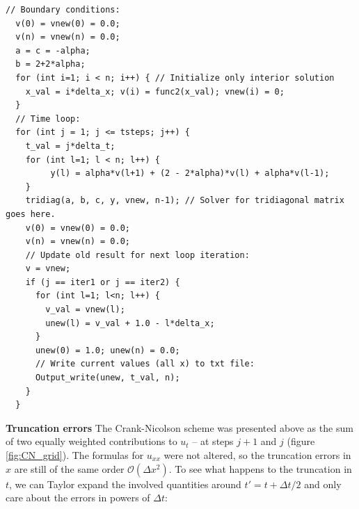 \documentclass[a4paper, 11pt, notitlepage,english]{article}
\begin{document}
\begin{center}
\begin{lstlisting}
// Boundary conditions:
  v(0) = vnew(0) = 0.0;
  v(n) = vnew(n) = 0.0;
  a = c = -alpha; 
  b = 2+2*alpha; 
  for (int i=1; i < n; i++) { // Initialize only interior solution
    x_val = i*delta_x; v(i) = func2(x_val); vnew(i) = 0;
  }
  // Time loop: 
  for (int j = 1; j <= tsteps; j++) {
    t_val = j*delta_t;
    for (int l=1; l < n; l++) {
         y(l) = alpha*v(l+1) + (2 - 2*alpha)*v(l) + alpha*v(l-1);
    }
    tridiag(a, b, c, y, vnew, n-1); // Solver for tridiagonal matrix goes here.
    v(0) = vnew(0) = 0.0;
    v(n) = vnew(n) = 0.0;
    // Update old result for next loop iteration:
    v = vnew;
    if (j == iter1 or j == iter2) {
      for (int l=1; l<n; l++) {
        v_val = vnew(l);
        unew(l) = v_val + 1.0 - l*delta_x;
      }
      unew(0) = 1.0; unew(n) = 0.0;
      // Write current values (all x) to txt file:
      Output_write(unew, t_val, n);
    }
  }
\end{lstlisting}
\end{center}

\textbf{Truncation errors} \newline
The Crank-Nicolson scheme was presented above as the sum of two equally weighted contributions to $u_t$ – at steps $j+1$ and $j$ (figure \ref{fig:CN_grid}). The formulas for $u_{xx}$ were not altered, so the truncation errors in $x$ are still of the same order $\mathcal{O}(\Delta x^2)$. To see what happens to the truncation in $t$, we can Taylor expand the involved quantities around $t' = t + \Delta t /2$ and only care about the errors in powers of $\Delta t$:
\end{document}
